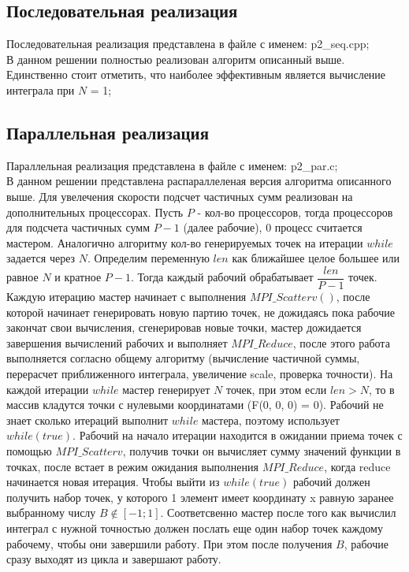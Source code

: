 \documentclass[12pt, a4paper ]{article}
\begin{document}
\subsection{\large Последовательная реализация}
Последовательная реализация представлена в файле с именем: p2\_seq.cpp;\\[10pt] В данном решении полностью реализован алгоритм описанный выше. Единственно стоит отметить, что наиболее эффективным является вычисление интеграла при $N$ = 1;
\subsection{\large Параллельная реализация}
Параллельная реализация представлена в файле с именем: p2\_par.c;\\[10pt] В данном решении представлена распараллеленая версия алгоритма описанного выше. Для увелечения скорости подсчет частичных сумм реализован на дополнительных процессорах. Пусть $P$ - кол-во процессоров, тогда процессоров для подсчета частичных сумм $P - 1$ (далее рабочие), 0 процесс считается мастером. Аналогично алгоритму кол-во генерируемых точек на итерации $while$ задается через $N$. Определим переменную $len$ как ближайшее целое большее или равное $N$ и кратное $P - 1$. Тогда каждый рабочий обрабатывает $\dfrac{len} {P - 1}$ точек. Каждую итерацию мастер начинает с выполнения $MPI\_Scatterv()$, после которой начинает генерировать новую партию точек, не дожидаясь пока рабочие закончат свои вычисления, сгенерировав новые точки, мастер дожидается завершения вычислений рабочих и выполняет $MPI\_Reduce$, после этого работа выполняется согласно общему алгоритму (вычисление частичной суммы, перерасчет приближенного интеграла, увеличение scale, проверка точности). На каждой итерации $while$ мастер генерирует $N$ точек, при этом если $len > N$, то в массив кладутся точки с нулевыми координатами (F(0, 0, 0) = 0).  Рабочий не знает сколько итераций выполнит $while$ мастера, поэтому использует  $while(true)$. Рабочий на начало итерации находится в ожидании приема точек с помощью $MPI\_Scatterv$, получив точки он вычисляет сумму значений функции в точках, после встает в режим ожидания выполнения $MPI\_Reduce$, когда reduce начинается новая итерация. Чтобы выйти из $while(true)$ рабочий должен получить набор точек, у которого 1 элемент имеет координату x равную заранее выбранному числу $B \notin [-1; 1]$. Соответсвенно мастер после того как вычислил интеграл с нужной точностью должен послать еще один набор точек каждому рабочему, чтобы они завершили работу. При этом после получения  $B$, рабочие сразу выходят из цикла и завершают работу.
\end{document}
